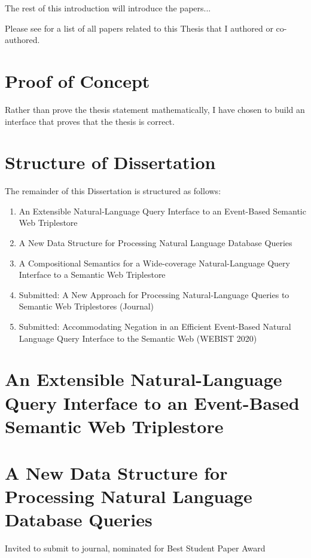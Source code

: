 \documentclass[../main.tex]{subfiles}
\begin{document}
\begin{refsection}
The rest of this introduction will introduce the papers...

Please see  for a list of all papers related to this Thesis that I authored or co-authored. \cite{peelar2016accommodating}

\section{Proof of Concept}

Rather than prove the thesis statement mathematically, I have chosen to build an interface that
proves that the thesis is correct.

\section{Structure of Dissertation}

The remainder of this Dissertation is structured as follows:

\begin{enumerate}
	\item An Extensible Natural-Language Query Interface to an Event-Based Semantic Web Triplestore
	\item A New Data Structure for Processing Natural Language Database Queries
	\item A Compositional Semantics for a Wide-coverage Natural-Language Query Interface to a Semantic Web Triplestore
	\item Submitted: A New Approach for Processing Natural-Language Queries to Semantic Web Triplestores (Journal)
    \item Submitted: Accommodating Negation in an Efficient Event-Based Natural Language Query Interface to the Semantic Web (WEBIST 2020)
\end{enumerate}

\section{An Extensible Natural-Language Query Interface to an Event-Based Semantic Web Triplestore}

\section{A New Data Structure for Processing Natural Language Database Queries}

Invited to submit to journal, nominated for Best Student Paper Award


\end{refsection}
\end{document}
